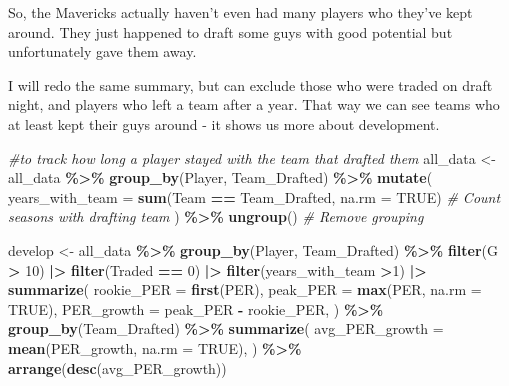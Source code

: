 \documentclass[
]{article}
\newenvironment{Shaded}{\begin{snugshade}}{\end{snugshade}}
\newcommand{\AttributeTok}[1]{\textcolor[rgb]{0.13,0.29,0.53}{#1}}
\newcommand{\CommentTok}[1]{\textcolor[rgb]{0.56,0.35,0.01}{\textit{#1}}}
\newcommand{\ConstantTok}[1]{\textcolor[rgb]{0.56,0.35,0.01}{#1}}
\newcommand{\DecValTok}[1]{\textcolor[rgb]{0.00,0.00,0.81}{#1}}
\newcommand{\FunctionTok}[1]{\textcolor[rgb]{0.13,0.29,0.53}{\textbf{#1}}}
\newcommand{\NormalTok}[1]{#1}
\newcommand{\OtherTok}[1]{\textcolor[rgb]{0.56,0.35,0.01}{#1}}
\newcommand{\SpecialCharTok}[1]{\textcolor[rgb]{0.81,0.36,0.00}{\textbf{#1}}}
\begin{document}
So, the Mavericks actually haven't even had many players who they've
kept around. They just happened to draft some guys with good potential
but unfortunately gave them away.

I will redo the same summary, but can exclude those who were traded on
draft night, and players who left a team after a year. That way we can
see teams who at least kept their guys around - it shows us more about
development.

\begin{Shaded}
\begin{Highlighting}[]
\CommentTok{\#to track how long a player stayed with the team that drafted them}
\NormalTok{all\_data }\OtherTok{\textless{}{-}}\NormalTok{ all\_data }\SpecialCharTok{\%\textgreater{}\%}
  \FunctionTok{group\_by}\NormalTok{(Player, Team\_Drafted) }\SpecialCharTok{\%\textgreater{}\%}
  \FunctionTok{mutate}\NormalTok{(}
    \AttributeTok{years\_with\_team =} \FunctionTok{sum}\NormalTok{(Team }\SpecialCharTok{==}\NormalTok{ Team\_Drafted, }\AttributeTok{na.rm =} \ConstantTok{TRUE}\NormalTok{)  }\CommentTok{\# Count seasons with drafting team}
\NormalTok{  ) }\SpecialCharTok{\%\textgreater{}\%}
  \FunctionTok{ungroup}\NormalTok{()  }\CommentTok{\# Remove grouping}
\end{Highlighting}
\end{Shaded}

\begin{Shaded}
\begin{Highlighting}[]
\NormalTok{develop }\OtherTok{\textless{}{-}}\NormalTok{ all\_data }\SpecialCharTok{\%\textgreater{}\%}
  \FunctionTok{group\_by}\NormalTok{(Player, Team\_Drafted) }\SpecialCharTok{\%\textgreater{}\%} \FunctionTok{filter}\NormalTok{(G }\SpecialCharTok{\textgreater{}} \DecValTok{10}\NormalTok{) }\SpecialCharTok{|\textgreater{}} \FunctionTok{filter}\NormalTok{(Traded }\SpecialCharTok{==} \DecValTok{0}\NormalTok{) }\SpecialCharTok{|\textgreater{}} \FunctionTok{filter}\NormalTok{(years\_with\_team }\SpecialCharTok{\textgreater{}}\DecValTok{1}\NormalTok{) }\SpecialCharTok{|\textgreater{}}
  \FunctionTok{summarize}\NormalTok{(}
    \AttributeTok{rookie\_PER =} \FunctionTok{first}\NormalTok{(PER),}
    \AttributeTok{peak\_PER =} \FunctionTok{max}\NormalTok{(PER, }\AttributeTok{na.rm =} \ConstantTok{TRUE}\NormalTok{),}
    \AttributeTok{PER\_growth =}\NormalTok{ peak\_PER }\SpecialCharTok{{-}}\NormalTok{ rookie\_PER,}
\NormalTok{  ) }\SpecialCharTok{\%\textgreater{}\%}
  \FunctionTok{group\_by}\NormalTok{(Team\_Drafted) }\SpecialCharTok{\%\textgreater{}\%}
  \FunctionTok{summarize}\NormalTok{(}
    \AttributeTok{avg\_PER\_growth =} \FunctionTok{mean}\NormalTok{(PER\_growth, }\AttributeTok{na.rm =} \ConstantTok{TRUE}\NormalTok{),}
\NormalTok{  ) }\SpecialCharTok{\%\textgreater{}\%}
  \FunctionTok{arrange}\NormalTok{(}\FunctionTok{desc}\NormalTok{(avg\_PER\_growth))}
\end{Highlighting}
\end{Shaded}
\end{document}
